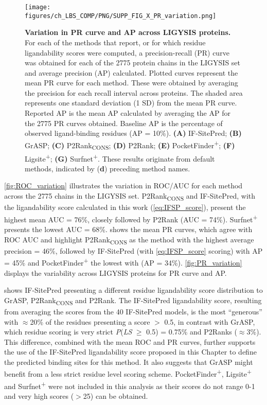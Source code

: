 \begin{figure}[htbp!]
    \centering
    \texttt{[image: figures/ch\_LBS\_COMP/PNG/SUPP\_FIG\_X\_PR\_variation.png]}
    \caption[Variation in PR curve and AP across LIGYSIS proteins]{\textbf{Variation in PR curve and AP across LIGYSIS proteins.} For each of the methods that report, or for which residue ligandability scores were computed, a precision-recall (PR) curve was obtained for each of the 2775 protein chains in the LIGYSIS set and average precision (AP) calculated. Plotted curves represent the mean PR curve for each method. These were obtained by averaging the precision for each recall interval across proteins. The shaded area represents one standard deviation (1 SD) from the mean PR curve. Reported AP is the mean AP calculated by averaging the AP for the 2775 PR curves obtained. Baseline AP is the percentage of observed ligand-binding residues (AP = 10\%). \textbf{(A)} IF-SitePred; \textbf{(B)} GrASP; \textbf{(C)} P2Rank\textsubscript{CONS}; \textbf{(D)} P2Rank; \textbf{(E)} PocketFinder\textsuperscript{+}; \textbf{(F)} Ligsite\textsuperscript{+}; \textbf{(G)} Surfnet\textsuperscript{+}. These results originate from default methods, indicated by (\textbf{d}) preceding method names.}
    \label{fig:PR_variation}
\end{figure}

\autoref{fig:ROC_variation} illustrates the variation in ROC/AUC for each method across the 2775 chains in the LIGYSIS set. P2Rank\textsubscript{CONS} and IF-SitePred, with the ligandability score calculated in this work (\autoref{eq:IFSP_score}), present the highest mean AUC = 76\%, closely followed by P2Rank (AUC = 74\%). Surfnet\textsuperscript{+} presents the lowest AUC = 68\%.  shows the mean PR curves, which agree with ROC AUC and highlight P2Rank\textsubscript{CONS} as the method with the highest average precision = 46\%, followed by IF-SitePred (with \autoref{eq:IFSP_score} scoring) with AP = 45\% and PocketFinder\textsuperscript{+} the lowest with (AP = 34\%). \autoref{fig:PR_variation} displays the variability across LIGYSIS proteins for PR curve and AP.

\newpage

 shows IF-SitePred presenting a different residue ligandability score distribution to GrASP, P2Rank\textsubscript{CONS} and P2Rank. The IF-SitePred ligandability score, resulting from averaging the scores from the 40 IF-SitePred models, is the most ``generous'' with $\approx$20\% of the residues presenting a score $>$ 0.5, in contrast with GrASP, which residue scoring is very strict \textit{P}(\textit{LS} $\geq$ 0.5) = 0.75\% and P2Ranks ($\approx$3\%). This difference, combined with the mean ROC and PR curves, further supports the use of the IF-SitePred ligandability score proposed in this Chapter to define the predicted binding sites for this method. It also suggests that GrASP might benefit from a less strict residue level scoring scheme. PocketFinder\textsuperscript{+}, Ligsite\textsuperscript{+} and Surfnet\textsuperscript{+} were not included in this analysis as their scores do not range 0-1 and very high scores ($>$25) can be obtained.

